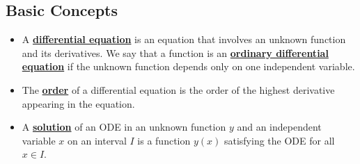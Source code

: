 \documentclass[11pt]{article}
\newcommand{\dfn}[1]{\underline{\textbf{#1}}}
\begin{document}
\subsection{Basic Concepts}
\begin{itemize}[noitemsep]
	\item A \dfn{differential equation} is an equation that involves an unknown function and its derivatives. We say that a function is an \dfn{ordinary differential equation} if the unknown function depends only on one independent variable. 
	\item The \dfn{order} of a differential equation is the order of the highest derivative appearing in the equation.
	\item A \dfn{solution} of an ODE in an unknown function $y$ and an independent variable $x$ on an interval $I$ is a function $y(x)$ satisfying the ODE for all $x \in I$. 
\end{itemize}
\end{document}
